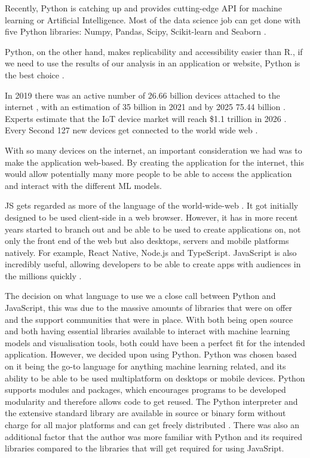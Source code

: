 	Recently, Python is catching up and provides cutting-edge API for machine learning or Artificial Intelligence. Most of the data science job can get done with five Python libraries: Numpy, Pandas, Scipy, Scikit-learn and Seaborn \cite{r_vs_py}.
	
	Python, on the other hand, makes replicability and accessibility easier than R., if we need to use the results of our analysis in an application or website, Python is the best choice \cite{r_vs_py}.
	
	In 2019 there was an active number of 26.66 billion devices attached to the internet \cite{securitytoday, statista_iot}, with an estimation of 35 billion in 2021 \cite{securitytoday} and by 2025 75.44 billion \cite{statista_iot}. Experts estimate that the IoT device market will reach \$1.1 trillion in 2026 \cite{securitytoday}. Every Second 127 new devices get connected to the world wide web \cite{securitytoday}.
	
	With so many devices on the internet, an important consideration we had was to make the application web-based. By creating the application for the internet, this would allow potentially many more people to be able to access the application and interact with the different ML models. 
	
	JS gets regarded as more of the language of the world-wide-web \cite{web_foundation}. It got initially designed to be used client-side in a web browser. However, it has in more recent years started to branch out and be able to be used to create applications on, not only the front end of the web but also desktops, servers and mobile platforms natively. For example, React Native, Node.js and TypeScript. JavaScript is also incredibly useful, allowing developers to be able to create apps with audiences in the millions quickly \cite{js_springboard}.
	
	The decision on what language to use we a close call between Python and JavaScript, this was due to the massive amounts of libraries that were on offer and the support communities that were in place. With both being open source and both having essential libraries available to interact with machine learning models and visualisation tools, both could have been a perfect fit for the intended application. However, we decided upon using Python. Python was chosen based on it being the go-to language for anything machine learning related, and its ability to be able to be used multiplatform on desktops or mobile devices. Python supports modules and packages, which encourages programs to be developed modularity and therefore allows code to get reused. The Python interpreter and the extensive standard library are available in source or binary form without charge for all major platforms and can get freely distributed \cite{python_desc}. There was also an additional factor that the author was more familiar with Python and its required libraries compared to the libraries that will get required for using JavaSript.

